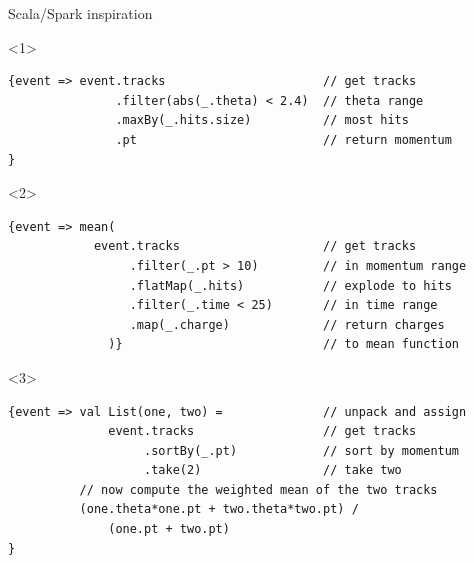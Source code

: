 \documentclass{beamer}
\begin{document}
\begin{frame}[fragile]{Scala/Spark inspiration}
\vspace{-0.2 cm}
\scriptsize
\begin{onlyenv}<1>
\begin{verbatim}
{event => event.tracks                      // get tracks
               .filter(abs(_.theta) < 2.4)  // theta range
               .maxBy(_.hits.size)          // most hits
               .pt                          // return momentum
}
\end{verbatim}
\end{onlyenv}
\begin{onlyenv}<2>
\begin{verbatim}
{event => mean(
            event.tracks                    // get tracks
                 .filter(_.pt > 10)         // in momentum range
                 .flatMap(_.hits)           // explode to hits
                 .filter(_.time < 25)       // in time range
                 .map(_.charge)             // return charges
              )}                            // to mean function
\end{verbatim}
\end{onlyenv}
\begin{onlyenv}<3>
\begin{verbatim}
{event => val List(one, two) =              // unpack and assign
              event.tracks                  // get tracks
                   .sortBy(_.pt)            // sort by momentum
                   .take(2)                 // take two
          // now compute the weighted mean of the two tracks
          (one.theta*one.pt + two.theta*two.pt) /
              (one.pt + two.pt)
}
\end{verbatim}
\end{onlyenv}
\end{frame}
\end{document}

